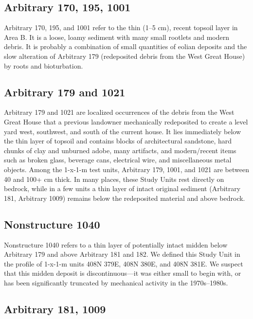 \documentclass[
  12pt,
]{krantz}
\begin{document}
\hypertarget{arbitrary-170-195-1001}{%
\subsection{Arbitrary 170, 195, 1001}\label{arbitrary-170-195-1001}}

Arbitrary 170, 195, and 1001 refer to the thin (1--5 cm), recent topsoil
layer in Area B. It is a loose, loamy sediment with many small rootlets
and modern debris. It is probably a combination of small quantities of
eolian deposits and the slow alteration of Arbitrary 179 (redeposited
debris from the West Great House) by roots and bioturbation.

\hypertarget{arbitrary-179-and-1021}{%
\subsection{Arbitrary 179 and 1021}\label{arbitrary-179-and-1021}}

Arbitrary 179 and 1021 are localized occurrences of the debris from the
West Great House that a previous landowner mechanically redeposited to
create a level yard west, southwest, and south of the current house. It
lies immediately below the thin layer of topsoil and contains blocks of
architectural sandstone, hard chunks of clay and unburned adobe, many
artifacts, and modern/recent items such as broken glass, beverage cans,
electrical wire, and miscellaneous metal objects. Among the 1-x-1-m test
units, Arbitrary 179, 1001, and 1021 are between 40 and 100+ cm thick.
In many places, these Study Units rest directly on bedrock, while in a
few units a thin layer of intact original sediment (Arbitrary 181,
Arbitrary 1009) remains below the redeposited material and above
bedrock.

\hypertarget{nonstructure-1040}{%
\subsection{Nonstructure 1040}\label{nonstructure-1040}}

Nonstructure 1040 refers to a thin layer of potentially intact midden
below Arbitrary 179 and above Arbitrary 181 and 182. We defined this
Study Unit in the profile of 1-x-1-m units 408N 379E, 408N 380E, and
408N 381E. We suspect that this midden deposit is discontinuous---it was
either small to begin with, or has been significantly truncated by
mechanical activity in the 1970s--1980s.

\hypertarget{arbitrary-181-1009}{%
\subsection{Arbitrary 181, 1009}\label{arbitrary-181-1009}}
\end{document}
